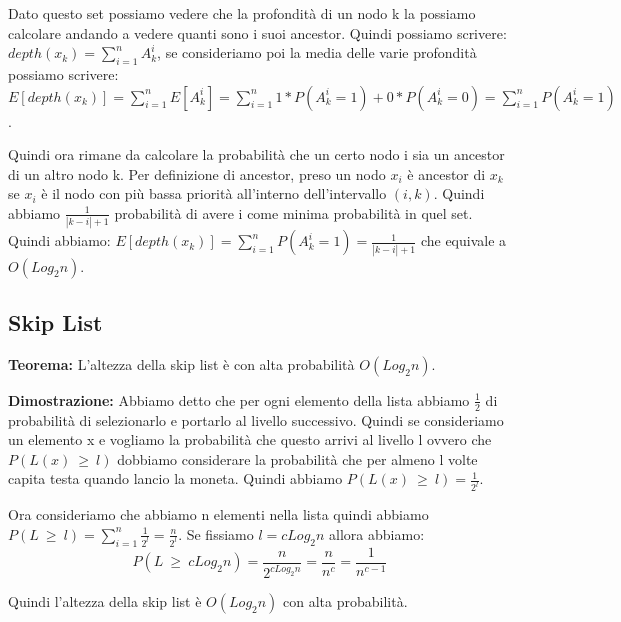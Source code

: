 \documentclass[12pt]{article}
\begin{document}
Dato questo set possiamo vedere che la profondità di un nodo k la possiamo calcolare andando a vedere quanti sono i suoi ancestor.
Quindi possiamo scrivere: $depth(x_k)=\sum^{n}_{i=1}A^i_k$, se consideriamo poi la media delle varie profondità possiamo scrivere: $E[depth(x_k)]=\sum^{n}_{i=1}E[A^i_k] = \sum^{n}_{i=1}1*P(A^i_k=1)+0*P(A^i_k=0)=\sum^{n}_{i=1}P(A^i_k=1)$.

Quindi ora rimane da calcolare la probabilità che un certo nodo i sia un ancestor di un altro nodo k. 
Per definizione di ancestor, preso un nodo $x_i$ è ancestor di $x_k$ se $x_i$ è il nodo con più bassa priorità all'interno dell'intervallo $(i,k)$.
Quindi abbiamo $\frac{1}{|k-i|+1}$ probabilità di avere i come minima probabilità in quel set.\\
Quindi abbiamo: $E[depth(x_k)]=\sum^{n}_{i=1}P(A^i_k=1)=\frac{1}{|k-i|+1}$ che equivale a $O(Log_2n)$.
    


\subsection{Skip List}

\textbf{Teorema:} L'altezza della skip list è con alta probabilità $O(Log_2n)$.

\textbf{Dimostrazione:} Abbiamo detto che per ogni elemento della lista abbiamo $\frac{1}{2}$ di probabilità di selezionarlo e portarlo al livello successivo. Quindi se consideriamo un elemento x e vogliamo la probabilità che questo arrivi al livello l ovvero che $P(L(x)\ \geq \ l)$ dobbiamo considerare la probabilità che per almeno l volte capita testa quando lancio la moneta. Quindi abbiamo $P(L(x)\ \geq \ l) = \frac{1}{2^l}$.

Ora consideriamo che abbiamo n elementi nella lista quindi abbiamo $P(L\ \geq \ l) = \sum^n_{i=1} \frac{1}{2^l} = \frac{n}{2^l}$.
Se fissiamo $l=cLog_2n$ allora abbiamo:
\begin{equation}
P(L\ \geq \ cLog_2n) = \frac{n}{2^{cLog_2n}} = \frac{n}{n^c} = \frac{1}{n^{c-1}}
\end{equation}

Quindi l'altezza della skip list è $O(Log_2 n)$ con alta probabilità.
\end{document}
